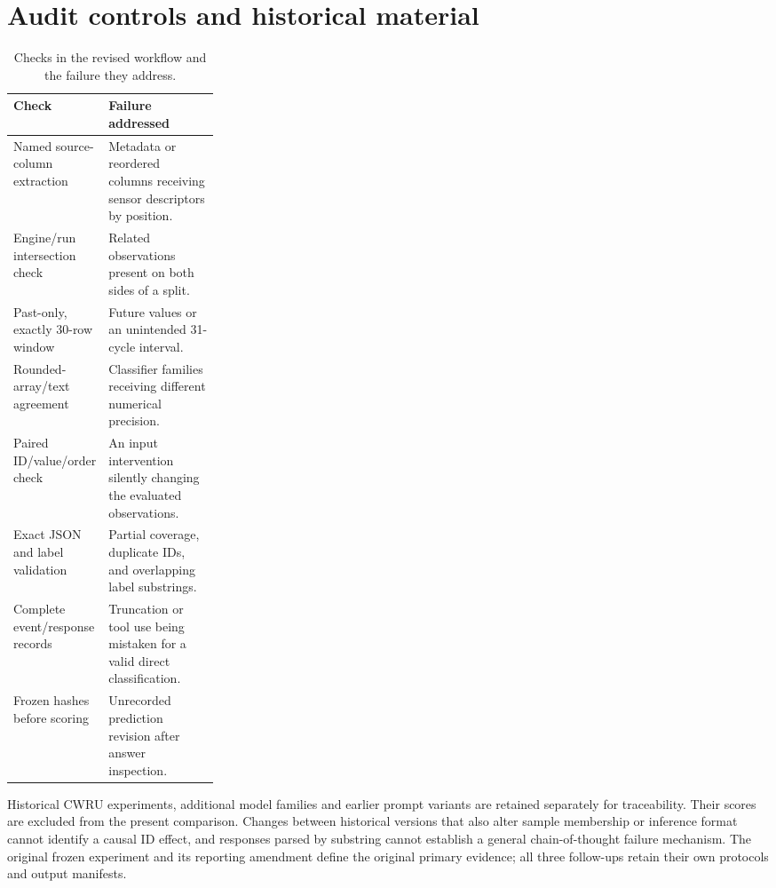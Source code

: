 \documentclass[11pt,a4paper]{article}
\begin{document}
\section{Audit controls and historical material}
\begin{table}[htbp]
\centering\small
\caption{Checks in the revised workflow and the failure they address.}
\label{tab:audit}
\begin{tabularx}{\linewidth}{@{}>{\raggedright\arraybackslash}p{0.27\linewidth}>{\raggedright\arraybackslash}X@{}}
\toprule
Check & Failure addressed \\
\midrule
Named source-column extraction & Metadata or reordered columns receiving sensor descriptors by position. \\
Engine/run intersection check & Related observations present on both sides of a split. \\
Past-only, exactly 30-row window & Future values or an unintended 31-cycle interval. \\
Rounded-array/text agreement & Classifier families receiving different numerical precision. \\
Paired ID/value/order check & An input intervention silently changing the evaluated observations. \\
Exact JSON and label validation & Partial coverage, duplicate IDs, and overlapping label substrings. \\
Complete event/response records & Truncation or tool use being mistaken for a valid direct classification. \\
Frozen hashes before scoring & Unrecorded prediction revision after answer inspection. \\
\bottomrule
\end{tabularx}
\end{table}

Historical CWRU experiments, additional model families and earlier prompt variants are retained separately for traceability. Their scores are excluded from the present comparison. Changes between historical versions that also alter sample membership or inference format cannot identify a causal ID effect, and responses parsed by substring cannot establish a general chain-of-thought failure mechanism. The original frozen experiment and its reporting amendment define the original primary evidence; all three follow-ups retain their own protocols and output manifests.
\end{document}
